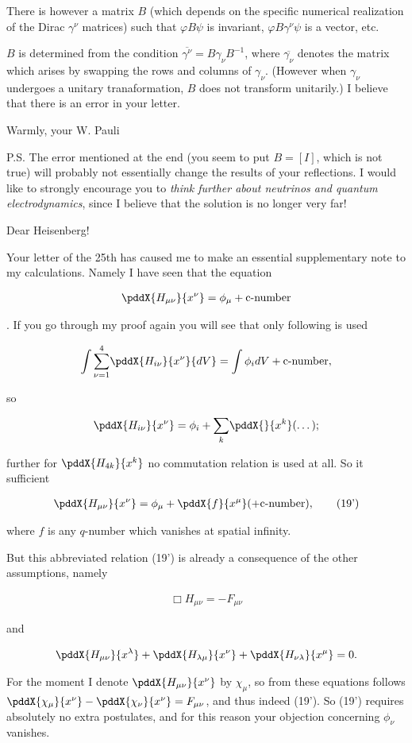 \documentclass{article}
\newcommand{\nequ}[2]{
\begin{align*}
#1
\tag{#2}
\end{align*}
}
\newcommand{\uequ}[1]{
\begin{align*}
#1
\end{align*}
}
\newcommand{\sumXY}[2]{\underset{#1}{\overset{#2}{\sum}}}
\newcommand{\sumX}[1]{\underset{#1}{\sum}}
\begin{document}
There is however a matrix $B$ (which depends on the specific numerical realization of the Dirac $\gamma^\nu$ matrices) such that $\varphi B \psi$ is invariant, $\varphi B \gamma^\nu \psi$ is a vector, etc.

$B$ is determined from the condition $\overline{\gamma^\nu} = B\gamma_\nu B^{-1}$, where $\overline{\gamma_\nu}$ denotes the matrix which arises by swapping the rows and columns of $\gamma_\nu$. (However when $\gamma_\nu$ undergoes a unitary tranaformation, $B$ does not transform unitarily.)
I believe that there is an error in your letter.

Warmly, your W. Pauli

P.S. The error mentioned at the end (you seem to put $B=[I]$, which is not true) will probably not essentially change the results of your reflections.
I would like to strongly encourage you to \textit{think further about neutrinos and quantum electrodynamics}, since I believe that the solution is no longer very far!


\date{January 27, 1934}

Dear Heisenberg!

Your letter of the 25th has caused me to make an essential supplementary note to my calculations. Namely I have seen that the equation
\uequ{
\pddX{H_{\mu\nu}}{x^\nu} = \phi_\mu + \text{c-number}
}
. If you go through my proof again you will see that only  following is used
\uequ{
\int\sumXY{\nu=1}{4}\pddX{H_{i\nu}}{x^\nu}{dV} = \int\phi_i {dV} + \text{c-number},
}
so
\uequ{
\pddX{H_{i\nu}}{x^\nu} = \phi_i + \sumX{k}\pddX{}{x^k}(\dots);
}
further for $\pddX{H_{4k}}{x^k}$ no commutation relation is used at all. So it sufficient 
\nequ{
\pddX{H_{\mu\nu}}{x^\nu} = \phi_\mu + \pddX{f}{x^\mu}(+ \text{c-number}),
}{19'}
where $f$ is any $q$-number which vanishes at spatial infinity.

But this abbreviated relation (19') is already a consequence of the other assumptions, namely
\uequ{
\Box H_{\mu\nu} = -F_{\mu\nu}
}
and
\uequ{
\pddX{H_{\mu\nu}}{x^\lambda} + 
\pddX{H_{\lambda\mu}}{x^\nu} + 
\pddX{H_{\nu\lambda}}{x^\mu} = 0.
}
For the moment I denote $\pddX{H_{\mu\nu}}{x^\nu}$ by $\chi_\mu$, so from these equations follows $\pddX{\chi_\mu}{x^\nu} - \pddX{\chi_\nu}{x^\nu} = F_{\mu\nu}$, and thus indeed (19'). So (19') requires absolutely no extra postulates, and for this reason your objection concerning $\phi_\nu$ vanishes.
\end{document}
